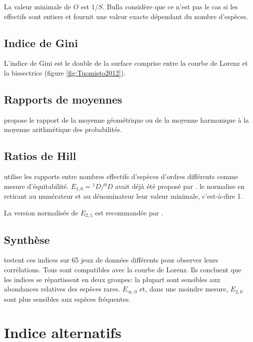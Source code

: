 \documentclass[
  11pt,
  french,
  a4paper,
  extrafontsizes,onecolumn,openright
  ]{memoir}
\newlength{\rf}
\begin{document}
La valeur minimale de \(O\) est \({1}/{S}\).
Bulla considère que ce n'est pas le cas si les effectifs sont entiers et fournit une valeur exacte dépendant du nombre d'espèces.

\subsection{Indice de Gini}\label{indice-de-gini}

L'indice de Gini est le double de la surface comprise entre la courbe de Lorenz et la bissectrice (figure \ref{fig:Tuomisto2012}).

\subsection{Rapports de moyennes}\label{rapports-de-moyennes}

\textcite{Taillie1979} propose le rapport de la moyenne géométrique ou de la moyenne harmonique à la moyenne arithmétique des probabilités.

\subsection{Ratios de Hill}\label{ratios-de-hill}

\textcite{Hill1973} utilise les rapports entre nombres effectifs d'espèces d'ordres différents comme mesure d'équitabilité.
\(E_{1,0} = {^{1}\!D}/{^{0}\!D}\) avait déjà été proposé par \textcite{Sheldon1969}.
\textcite{Peet1974} le normalise en retirant au numérateur et au dénominateur leur valeur minimale, c'est-à-dire 1.

La version normalisée de \(E_{2,1}\) est recommandée par \textcite{Alatalo1981}.

\subsection{Synthèse}\label{synthuxe8se-2}

\textcite{Ricotta2001} testent ces indices sur 65 jeux de données différents pour observer leurs corrélations.
Tous sont compatibles avec la courbe de Lorenz.
Ils concluent que les indices se répartissent en deux groupes: la plupart sont sensibles aux abondances relatives des espèces rares.
\(E_{\infty,0}\) et, dans une moindre mesure, \(E_{2,0}\) sont plus sensibles aux espèces fréquentes.

\section{Indice alternatifs}\label{indice-alternatifs}
\end{document}
